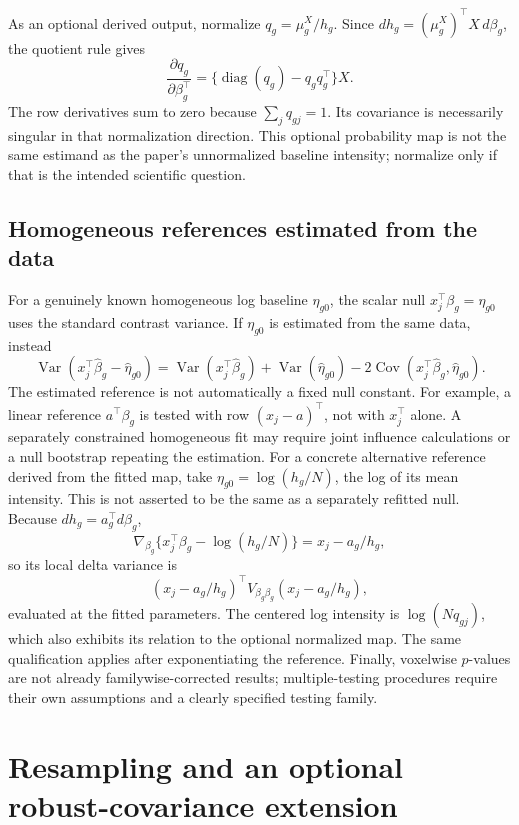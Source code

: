 \documentclass[11pt,a4paper]{article}
\newcommand{\Var}{\operatorname{Var}}
\newcommand{\Cov}{\operatorname{Cov}}
\newcommand{\diag}{\operatorname{diag}}
\numberwithin{equation}{section}
\begin{document}
As an optional derived output, normalize $q_g=\mu_g^X/h_g$.
Since $dh_g=(\mu_g^X)^\top X\,d\beta_g$, the quotient rule gives
\begin{equation}
 \frac{\partial q_g}{\partial\beta_g^\top}
 =\{\diag(q_g)-q_gq_g^\top\}X .
\end{equation}
The row derivatives sum to zero because $\sum_jq_{gj}=1$.
Its covariance is necessarily singular in that normalization direction.
This optional probability map is not the same estimand as the paper's
unnormalized baseline intensity; normalize only if that is the intended
scientific question.

\subsection{Homogeneous references estimated from the data}
For a genuinely known homogeneous log baseline $\eta_{g0}$,
the scalar null $x_j^\top\beta_g=\eta_{g0}$ uses the standard contrast
variance. If $\eta_{g0}$ is estimated from the same data, instead
\begin{equation}
 \Var(x_j^\top\widehat\beta_g-\widehat\eta_{g0})
 =\Var(x_j^\top\widehat\beta_g)+\Var(\widehat\eta_{g0})
          -2\Cov(x_j^\top\widehat\beta_g,\widehat\eta_{g0}).
\end{equation}
The estimated reference is not automatically a fixed null constant.
For example, a linear reference $a^\top\beta_g$ is tested with
row $(x_j-a)^\top$, not with $x_j^\top$ alone.
A separately constrained homogeneous fit may require joint influence
calculations or a null bootstrap repeating the estimation.
For a concrete alternative reference derived from the fitted map,
take $\eta_{g0}=\log(h_g/N)$, the log of its mean intensity.
This is not asserted to be the same as a separately refitted null.
Because $dh_g=a_g^\top d\beta_g$,
\[
 \nabla_{\beta_g}\{x_j^\top\beta_g-\log(h_g/N)\}
      =x_j-a_g/h_g,
\]
so its local delta variance is
\[
 (x_j-a_g/h_g)^\top V_{\beta_g\beta_g}(x_j-a_g/h_g),
\]
evaluated at the fitted parameters. The centered log intensity is
$\log(Nq_{gj})$, which also exhibits its relation to the optional
normalized map.
The same qualification applies after exponentiating the reference.
Finally, voxelwise $p$-values are not already familywise-corrected results;
multiple-testing procedures require their own assumptions and a
clearly specified testing family.

\section{Resampling and an optional robust-covariance extension}\label{sec:bootstrap}
\end{document}
